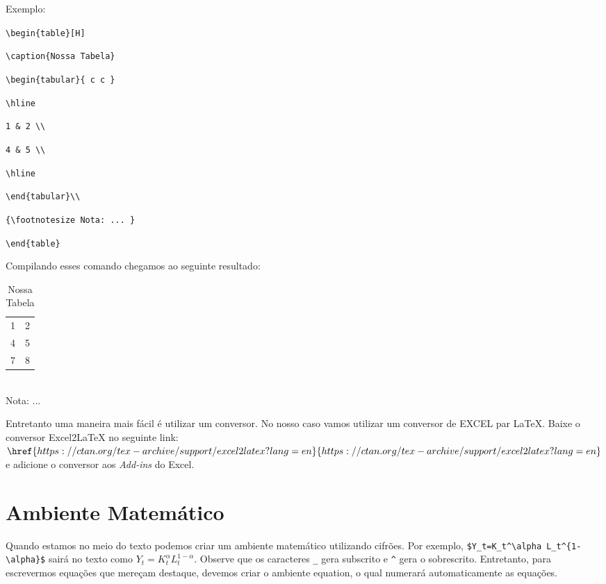 \documentclass[12pt,oneside,a4paper,chapter=TITLE,english,brazil,sumario=abnt-6027-2012]{abntex2}
\begin{document}
\vspace{0.2cm}

Exemplo:

\verb|\begin{table}[H]| 

\verb|\caption{Nossa Tabela}| 
	
\verb|\begin{tabular}{ c c }| 

\verb|\hline|

\verb|1 & 2 \\|	

\verb|4 & 5 \\|	

\verb|\hline|

\verb|\end{tabular}\\|

\verb|{\footnotesize Nota: ... }|

\verb|\end{table}|

\vspace{0.2cm}

Compilando esses comando chegamos ao seguinte resultado: 

\vspace{0.2cm}

\begin{table}[H]
	\caption{Nossa Tabela}
\begin{tabular}{ c  c }
	\hline
	1 & 2  \\
	4 & 5  \\
	7 & 8  \\
	\hline
\end{tabular}\\
{\footnotesize Nota: ... }
\end{table}
\vspace{0.5cm}

Entretanto uma maneira mais fácil é utilizar um conversor.  No nosso caso vamos utilizar um conversor de EXCEL par {\LaTeX}. Baixe o conversor Excel2LaTeX no seguinte link: {$\href{https://ctan.org/tex-archive/support/excel2latex?lang=en}{https://ctan.org/tex-archive/support/excel2latex?lang=en}$} e adicione o conversor aos \textit{Add-ins} do Excel. 


\section{Ambiente Matemático}

Quando estamos no meio do texto podemos criar um ambiente matemático utilizando cifrões. Por exemplo, \verb|$Y_t=K_t^\alpha L_t^{1-\alpha}$| sairá no texto como $Y_t=K_t^\alpha L_t^{1-\alpha}$. Observe que os caracteres \verb|_| gera subscrito e \verb|^| gera o sobrescrito. Entretanto, para escrevermos equações que mereçam destaque, devemos criar o ambiente equation, o qual numerará automaticamente as equações.  
\end{document}
